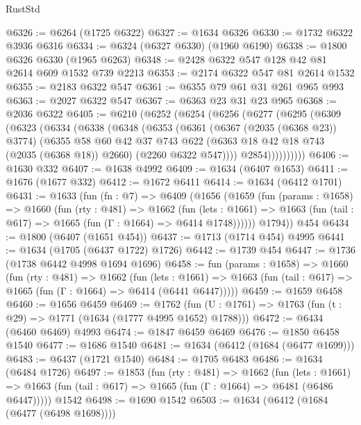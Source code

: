 \begin{lexlean}{RustStd}
\begin{coremodule}
@6326 := @6264 (@1725 @6322)
@6327 := @1634 @6326
@6330 := @1732 @6322 @3936 @6316
@6334 := @6324 (@6327 @6330) (@1960 @6190)
@6338 := @1800 @6326 @6330 (@1965 @6263)
@6348 := @2428 @6322 @547 @128 @42 @81 @2614 @609 @1532 @739 @2213
@6353 := @2174 @6322 @547 @81 @2614 @1532
@6355 := @2183 @6322 @547
@6361 := @6355 @79 @61 @31 @261 @965 @993
@6363 := @2027 @6322 @547
@6367 := @6363 @23 @31 @23 @965
@6368 := @2036 @6322
@6405 := @6210
    (@6252
      (@6254
        (@6256
          (@6277
            (@6295
              (@6309
                (@6323
                  (@6334
                    (@6338
                      (@6348
                        (@6353
                          (@6361
                            (@6367 (@2035 (@6368 @23)) @3774)
                            (@6355
                              @58
                              @60
                              @42
                              @37
                              @743
                              @622
                              (@6363 @18 @42 @18 @743 (@2035 (@6368 @18)) @2660)
                              (@2260 @6322 @547))))
                        @2854))))))))))
@6406 := @1630 @332
@6407 := @1638 @4992
@6409 := @1634 (@6407 @1653)
@6411 := @1676 (@1677 @332)
@6412 := @1672 @6411
@6414 := @1634 (@6412 @1701)
@6431 := @1633
    (fun (fn : @7) =>
    @6409
      (@1656
        (@1659
          (fun (params : @1658) =>
          @1660
            (fun (rty : @481) =>
            @1662
              (fun (lets : @1661) =>
              @1663 (fun (tail : @617) => @1665 (fun (Γ : @1664) => @6414 @1748))))))
        @1794))
    @454
@6434 := @1800 (@6407 (@1651 @454))
@6437 := @1713 (@1714 @454) @4995
@6441 := @1634 (@1705 (@6437 @1722) @1726)
@6442 := @1739 @454
@6447 := @1736 (@1738 @6442 @4998 @1694 @1696)
@6458 := fun (params : @1658) =>
  @1660
    (fun (rty : @481) =>
    @1662
      (fun (lets : @1661) =>
      @1663 (fun (tail : @617) => @1665 (fun (Γ : @1664) => @6414 (@6441 @6447)))))
@6459 := @1659 @6458
@6460 := @1656 @6459
@6469 := @1762 (fun (U : @1761) => @1763 (fun (t : @29) => @1771 (@1634 (@1777 @4995 @1652) @1788)))
@6472 := @6434 (@6460 @6469) @4993
@6474 := @1847 @6459 @6469
@6476 := @1850 @6458 @1540
@6477 := @1686 @1540
@6481 := @1634 (@6412 (@1684 (@6477 @1699)))
@6483 := @6437 (@1721 @1540)
@6484 := @1705 @6483
@6486 := @1634 (@6484 @1726)
@6497 := @1853
    (fun (rty : @481) =>
    @1662
      (fun (lets : @1661) =>
      @1663 (fun (tail : @617) => @1665 (fun (Γ : @1664) => @6481 (@6486 @6447)))))
    @1542
@6498 := @1690 @1542
@6503 := @1634 (@6412 (@1684 (@6477 (@6498 @1698))))

\end{coremodule}
\end{lexlean}
